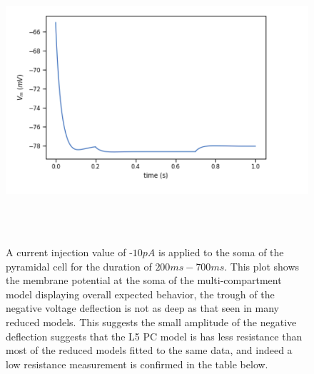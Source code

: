 \begin{figure}
\begin{center}

    \includegraphics[scale=0.8]{figures/correct_passive_l5pc.png}
    \caption[passive virtual experiment in the Layer 5 Pyramidal Cell]{A current injection value of -$10pA$ is applied to the soma of the pyramidal cell for the duration of $200ms-700ms$. This plot shows the membrane potential at the soma of the multi-compartment model displaying overall expected behavior, the trough of the negative voltage deflection is not as deep as that seen in many reduced models. This suggests the small amplitude of the negative deflection suggests that the L5 PC model is has less resistance than most of the reduced models fitted to the same data, and indeed a low resistance measurement is confirmed in the table below.}
  \label{fig:sub2}
\end{center}
\end{figure}



